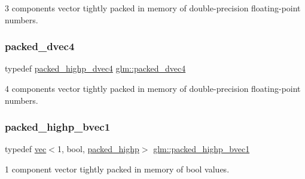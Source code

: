 3 components vector tightly packed in memory of double-\/precision floating-\/point numbers. 

\mbox{\label{group__gtc__type__aligned_ga858e69be626bfb48d644d8d6fe81b1a2}} 
\subsubsection{\texorpdfstring{packed\+\_\+dvec4}{packed\_dvec4}}
{\footnotesize\ttfamily typedef \hyperlink{group__gtc__type__aligned_ga7eb6a2440202876a3a223a1931dd496a}{packed\+\_\+highp\+\_\+dvec4} \hyperlink{group__gtc__type__aligned_ga858e69be626bfb48d644d8d6fe81b1a2}{glm\+::packed\+\_\+dvec4}}



4 components vector tightly packed in memory of double-\/precision floating-\/point numbers. 

\mbox{\label{group__gtc__type__aligned_ga00ef8acfca23dca78e1baa65bb5861ac}} 
\subsubsection{\texorpdfstring{packed\+\_\+highp\+\_\+bvec1}{packed\_highp\_bvec1}}
{\footnotesize\ttfamily typedef \hyperlink{structglm_1_1vec}{vec}$<$1, bool, \hyperlink{namespaceglm_a36ed105b07c7746804d7fdc7cc90ff25a8e8791ee77fe079b1291f710d88031bf}{packed\+\_\+highp}$>$ \hyperlink{group__gtc__type__aligned_ga00ef8acfca23dca78e1baa65bb5861ac}{glm\+::packed\+\_\+highp\+\_\+bvec1}}



1 component vector tightly packed in memory of bool values. 

\mbox{\label{group__gtc__type__aligned_ga8059c50785881a9f30b9a8e3ff5daf83}} 
